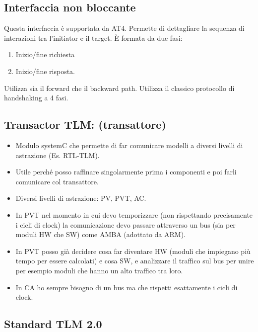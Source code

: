 \documentclass[a4paper]{article}
\begin{document}
	\subsection{Interfaccia non bloccante}
		Questa interfaccia è supportata da AT4. Permette di dettagliare la sequenza di interazioni tra l'initiator e il target. È formata da due fasi:
		\begin{enumerate}
			\item Inizio/fine richiesta
			\item Inizio/fine risposta.
		\end{enumerate}
		Utilizza sia il forward che il backward path. Utilizza il classico protocollo di handshaking a 4 fasi.
			
	\subsection{Transactor TLM: (transattore)}
	
	\begin{itemize}
		\item Modulo systemC che permette di far comunicare modelli a diversi livelli di astrazione (Es. RTL-TLM).
		\item Utile perché posso raffinare singolarmente prima i componenti e poi farli comunicare col transattore.
		\item Diversi livelli di astrazione: PV, PVT, AC.
		\item In PVT nel momento in cui devo temporizzare (non rispettando precisamente i cicli di clock) la comunicazione devo passare attraverso un bus (sia per moduli HW che SW) come AMBA (adottato da ARM).
		\item In PVT posso già decidere cosa far diventare HW (moduli che impiegano più tempo per essere calcolati) e cosa SW, e analizzare il traffico sul bus per unire per esempio moduli che hanno un alto traffico tra loro. 
		\item In CA ho sempre bisogno di un bus ma che rispetti esattamente i cicli di clock.
	\end{itemize}
	
	
	\subsection{Standard TLM 2.0}
	
\end{document}
